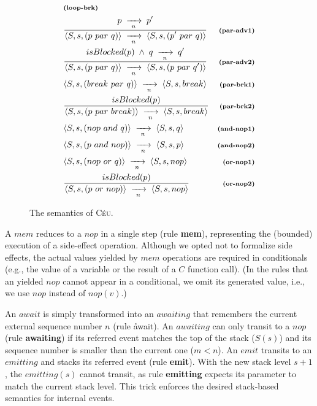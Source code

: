 \documentclass{acm_proc_article-sp}
\newcommand{\CEU}{\textsc{C\'{e}u}\xspace}
\newcommand{\code}[1] {{\small{\texttt{#1}}}}
\newcommand{\ST}{\1\xrightarrow[~n~]{}\1}
\newcommand{\LL}{\langle}
\newcommand{\RR}{\rangle}
\newcommand{\DS}{\displaystyle}
\newcommand{\rr}[1] {{\textbf{\scriptsize{#1}}}}
\newcommand{\1}{\;}
\newcommand{\2}{\;\;}
\newcommand{\3}{\;\;\;}
\newcommand{\5}{\;\;\;\;\;}
\begin{document}
\begin{figure}
{\begin{eqnarray*}
    & \rr{(loop-brk)}       \\
%
& \frac
    {\DS p \ST p' }
    {\DS \LL S,s, (p~par~q) \RR \ST \LL S,s, (p'~par~q) \RR }
    & \rr{(par-adv1)}      \\
& \frac
    {\DS isBlocked(p) \1\wedge\1 q \ST q' }
    {\DS \LL S,s, (p~par~q) \RR \ST \LL S,s, (p~par~q') \RR }
    & \rr{(par-adv2)}      \\
& \LL S,s, (break~par~q) \RR \ST \LL S,s, break \RR
    & \rr{(par-brk1)}   \\
& \frac
    {\DS isBlocked(p) }
    {\DS \LL S,s, (p~par~break) \RR \ST \LL S,s, break \RR }
    & \rr{(par-brk2)}       \\
& \LL S,s, (nop~and~q) \RR \ST \LL S,s, q \RR
    & \rr{(and-nop1)}   \\
& \LL S,s, (p~and~nop) \RR \ST \LL S,s, p \RR
    & \rr{(and-nop2)}   \\
%
%
& \LL S,s, (nop~or~q) \RR \ST \LL S,s, nop \RR
    & \rr{(or-nop1)}   \\
& \frac
    {\DS isBlocked(p) }
    {\DS \LL S,s, (p~or~nop) \RR \ST \LL S,s, nop \RR }
    & \rr{(or-nop2)}
%
\end{eqnarray*}
}
%
\caption{ The semantics of \CEU.
\label{fig.sem}
}
\end{figure}

A $mem$ reduces to a $nop$ in a single step (rule \rr{mem}), representing the 
(bounded) execution of a side-effect operation.
Although we opted not to formalize side effects, the actual values yielded by 
$mem$ operations are required in conditionals (e.g., the value of a variable or 
the result of a $C$ function call).
(In the rules that an yielded $nop$ cannot appear in a conditional, we omit its 
generated value, i.e., we use $nop$ instead of $nop(v)$.)

An $await$ is simply transformed into an $awaiting$ that remembers the current 
external sequence number $n$ (rule \r{await}).
An $awaiting$ can only transit to a $nop$ (rule \rr{awaiting}) if its referred 
event matches the top of the stack ($S(s)$) and its sequence number is smaller 
than the current one ($m<n$).
%
%
An $emit$ transits to an $emitting$ and stacks its referred event (rule 
\rr{emit}).
With the new stack level $s+1$, the $emitting(s)$ cannot transit, as rule 
\rr{emitting} expects its parameter to match the current stack level.
This trick enforces the desired stack-based semantics for internal events.
\end{document}
